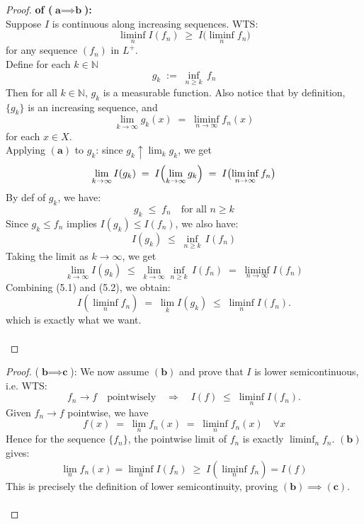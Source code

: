 \documentclass[lang=cn,11pt]{elegantbook}
\begin{document}
\begin{proof}
    \textbf{of (\(\textbf{a} \implies \textbf{b}\)):}\\
    Suppose \(I\) is continuous along increasing sequences. WTS: \[
  \liminf_{n} I(f_n) \;\ge\; I\!\bigl(\liminf_{n} f_n \bigr)
\]for any sequence \((f_n)\) in \(L^+\).\\
Define for each $k\in\mathbb{N}$ \[
    g_k \;:=\; \inf_{n \ge k}\, f_n
  \] Then for all $k \in \mathbb{N}$, $g_k$ is a measurable function. Also notice that by definition, $\{g_k\}$ is an increasing sequence, and  \[
    \lim_{k \to \infty} g_k(x) \;=\; \liminf_{n \to \infty} f_n(x)
  \]
for each \(x \in X\).\\
Applying \((\textbf{a})\) to \(g_k\): since \(g_k \uparrow \lim_{k} g_k\), we get \begin{equation}
      \lim_{k \to \infty} I(g_k)
    \;=\;
    I\Bigl(\lim_{k\to\infty} g_k\Bigr)
    \;=\;
    I\bigl(\liminf_{n \to \infty}  f_n\bigr)
 \end{equation}
By def of $g_k$, we have:  \[
    g_k \;\le\; f_n \quad \text{for all } n \ge k
  \]
Since  \(g_k \le f_n\) implies \(I(g_k) \le I(f_n)\), we also have: \[
    I(g_k) \;\le\; \inf_{n \ge k} \,I(f_n)
  \]
Taking the limit as \(k \to \infty\), we get 
\begin{equation}
\lim_{k\to\infty} I(g_k)
    \;\le\;
    \lim_{k\to\infty} \inf_{n \ge k}\, I(f_n)
    \;=\;
    \liminf_{n \to \infty} I(f_n)    
\end{equation}
Combining (5.1) and (5.2), we obtain: \[
    I(\liminf_{n} f_n)
    \;=\;
    \lim_{k} I(g_k)
    \;\le\;
    \liminf_{n} I(f_n).
  \] which is exactly what we want.\\\\\end{proof}
\begin{proof}
(\(\textbf{b} \implies \textbf{c}\)):  We now assume \((\textbf{b})\) and prove that \(I\) is lower semicontinuous, i.e. WTS: \[
  f_n \to f \quad \text{pointwisely} \quad \Longrightarrow \quad
  I(f) \;\le\; \liminf_{n} I(f_n).
\]
Given \(f_n \to f\) pointwise, we have
\[
  f(x)
  \;=\;
  \lim_{n} f_n(x)
  \;=\;
  \liminf_{n} f_n(x) \quad \forall x
\]
Hence for the sequence \(\{f_n\}\), the pointwise limit of \(f_n\) is exactly \(\liminf_{n} f_n\). \((\textbf{b})\) gives:
\[   \lim_{n} f_n(x) =   \liminf_{n} I(f_n) \;\ge\; I(\liminf_{n} f_n)=  I(f)\]
This is precisely the definition of lower semicontinuity, proving \((\textbf{b}) \implies (\textbf{c})\).\\\\
\end{proof}
\end{document}
